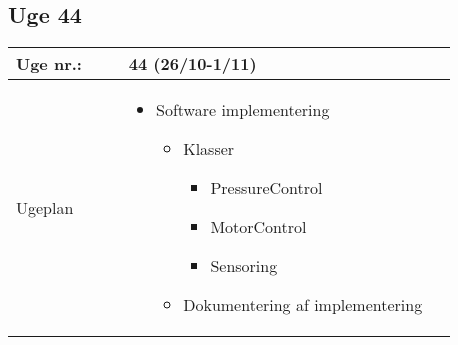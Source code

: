 	\subsection{Uge 44} \label{app:logUge44}
	\begin{longtable}{|p{0.24\linewidth}|p{0.7\linewidth}|}
		\hline
		Uge nr.: & 44 (26/10-1/11)\\ \hline
		Ugeplan & 
		\begin{itemize}
			\item Software implementering
			\begin{itemize}
				\item Klasser
				\begin{itemize}
					\item PressureControl
					\item MotorControl
					\item Sensoring
				\end{itemize}
				\item Dokumentering af implementering
			\end{itemize}
		\end{itemize}
		

\end{longtable}
